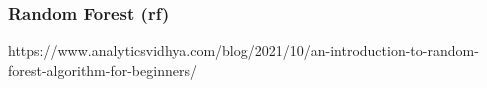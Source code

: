 \subsubsection{Random Forest (\acrshort{rf})}
\label{sec:rf}



https://www.analyticsvidhya.com/blog/2021/10/an-introduction-to-random-forest-algorithm-for-beginners/














